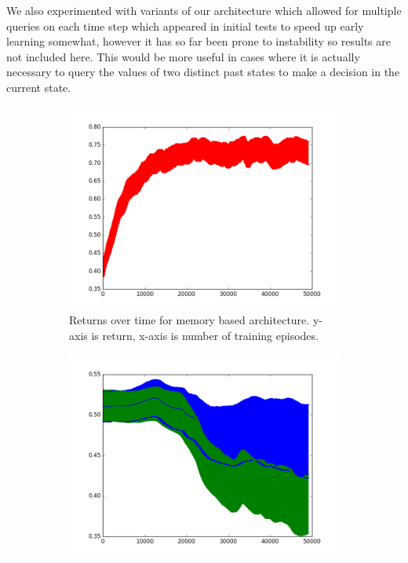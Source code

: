 \documentclass{article}
\begin{document}
We also experimented with variants of our architecture which allowed for multiple queries on each time step which appeared in initial tests to speed up early learning somewhat, however it has so far been prone to instability so results are not included here. This would be more useful in cases where it is actually necessary to query the values of two distinct past states to make a decision in the current state.
\begin{figure}[!ht]
\centering
\begin{subfigure}[t]{.45\textwidth}
  \centering
      \includegraphics[width=1\textwidth]{images/1_query_mem_ret.png}
  \caption{Returns over time for memory based architecture. y-axis is return, x-axis is number of training episodes.}
  \label{fig:1_query_ret}
\end{subfigure}\hfill
\begin{subfigure}[t]{.45\textwidth}
  \centering
      \includegraphics[width=1\textwidth]{images/1_query_mem_writes.png}

\end{subfigure}
\end{figure}
\end{document}
